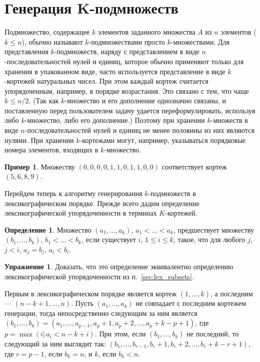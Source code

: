 \documentclass[12pt,a4paper]{article}
\theoremstyle{plain}
\theoremstyle{definition}
\newtheorem{definition}{Определение}
\newtheorem*{task}{Упражнение}
\newtheorem*{example}{Пример}
\theoremstyle{remark}
\begin{document}
\section{Генерация K-подмножеств}

Подмножество, содержащее $k$ элементов заданного множества $A$ из $n$ элементов ($k\le n$), обычно называют $k$-подмножествами просто $k$-множествами. Для представления $k$-подмножеств, наряду с представлением в виде $n$-последовательностей нулей и единиц, которое обычно применяют только для хранения в упакованном виде, часто используется представление в виде $k$-кортежей натуральных чисел. При этом каждый кортеж считается упорядоченным, например, в порядке возрастания. Это связано с тем, что чаще $k\le n/2$. (Так как $k$-множество и его дополнение однозначно связаны, и поставленную перед пользователем задачу удается переформулировать, используя либо $k$-множество, либо его дополнение.) Поэтому при хранении $k$-множеств в виде $n$-последовательностей нулей и единиц не менее половины из них являются нулями. При хранении $k$-кортежами могут, например, указываться порядковые номера элементов, входящих в $k$-множество. 

\begin{example}
Множеству $(0,0,0,0,1,1,0,1,1,0,0)$ соответствует кортеж $(5,6,8,9)$.
\end{example}

Перейдем теперь к алгоритму генерирования $k$-подмножеств в лексикографическом порядке. Прежде всего дадим определение лексикографической упорядоченности в терминах $K$-кортежей.

\begin{definition}
Множество $(a_1,\ldots,a_k)$, $a_1<\ldots<a_k$, предшествует множеству $(b_1,\ldots,b_k)$, $b_1<\ldots<b_k$, если существует $i$, $1\le i\le k$, такое, что для любого $j$, $j<i$, $a_j=b_j$, $a_i<b_i$.
\end{definition}

\begin{task}
Доказать, что это определение эквивалентно определению лексикографической упорядоченности из п.~\ref{sec:lex_subsets}.
\end{task}

Первым в лексикографическом порядке является кортеж $(1,\ldots,k)$, а последним --- $(n-k+1,\ldots,n)$. Пусть $(a_1,\ldots,a_k)$ не совпадает с последним кортежем генерации, тогда непосредственно следующим за ним является $(b_1,\ldots,b_k) = (a_1,\ldots,a_{p-1},a_p+1,a_p+2,\ldots,a_p+k-p+1)$, где $p=\max(i \vert\, a_i<n-k+i)$. При этом, если $(b_1,\ldots,b_k)$ не последний, то следующий за ним выглядит так: $(b_1,\ldots,b_{r-1},b_r+1,b_r+2,\ldots,b_r+k-r+1)$, где $r=p-1$, если $b_k=n$, и $k$, если $b_k<n$.
\end{document}
